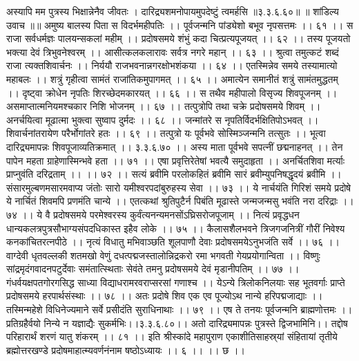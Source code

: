 अस्यापि मम पुत्रस्य भिक्षान्नेनैव जीवतः ।
दारिद्र्यशमनोपायमुपदेष्टुं त्वमर्हसि ॥३.३.६.६०॥
॥ शांडिल्य उवाच ॥॥
अमुष्य बालस्य पिता स विदर्भमहीपतिः ।।
पूर्वजन्मनि पांड्येशो बभूव नृपसत्तमः ।। ६१ ।।
स राजा सर्वधर्मज्ञः पालयन्सकलां महीम् ।।
प्रदोषसमये शंभुं कदा चित्प्रत्यपूजयत् ।। ६२ ।।
तस्य पूजयतो भक्त्या देवं त्रिभुवनेश्वरम् ।।
आसीत्कलकलारावः सर्वत्र नगरे महान् ।। ६३ ।।
श्रुत्वा तमुत्कटं शब्दं राजा त्यक्तशिवार्चनः ।।
निर्ययौ राजभवनान्नगरक्षोभशंकया ।। ६४ ।।
एतस्मिन्नेव समये तस्यामात्यो महाबलः ।।
शत्रुं गृहीत्वा सामंतं राजांतिकमुपागमत् ।। ६५ ।।
अमात्येन समानीतं शत्रुं सामंतमुद्धतम् ।।
दृष्ट्वा क्रोधेन नृपतिः शिरच्छेदमकारयत् ।। ६६ ।।
स तथैव महीपालो विसृज्य शिवपूजनम् ।।
असमाप्तात्मनियमश्चकार निशि भोजनम् ।। ६७ ।।
तत्पुत्रोपि तथा चक्रे प्रदोषसमये शिवम् ।।
अनर्चयित्वा मूढात्मा भुक्त्वा सुष्वाप दुर्मदः ।। ६८ ।।
जन्मांतरे स नृपतिर्विदर्भक्षितिपोऽभवत् ।।
शिवार्चनांतरायेण परैर्भोगांतरे हतः ।। ६९ ।।
तत्पुत्रो यः पूर्वभवे सोस्मिञ्जन्मनि तत्सुतः ।।
भूत्वा दारिद्र्यमापन्नः शिवपूजाव्यतिक्रमात् ।। ३.३.६.७० ।।
अस्य माता पूर्वभवे सपत्नीं छद्मनाहनत् ।।
तेन पापेन महता ग्राहेणास्मिन्भवे हता ।। ७१ ।।
एषा प्रवृत्तिरेतेषां भवत्यै समुदाहृता ।।
अनर्चितशिवा मर्त्याः प्राप्नुवंति दरिद्रताम् ।। ।। ७२ ।।
सत्यं ब्रवीमि परलोकहितं ब्रवीमि सारं ब्रवीम्युपनिषद्धृदयं ब्रवीमि ।।
संसारमुल्बणमसारमवाप्य जंतोः सारो यमीश्वरपदांबुरुहस्य सेवा ।। ७३ ।।
ये नार्चयंति गिरिशं समये प्रदोषे ये नार्चितं शिवमपि प्रणमंति चान्ये ।।
एतत्कथां श्रुतिपुटैर्न पिबंति मूढास्ते जन्मजन्मसु भवंति नरा दरिद्राः ।। ७४ ।।
ये वै प्रदोषसमये परमेश्वरस्य कुर्वंत्यनन्यमनसोंऽघ्रिसरोजपूजाम् ।।
नित्यं प्रवृद्धधन धान्यकलत्रपुत्रसौभाग्यसंपदधिकास्त इहैव लोके ।। ७५ ।।
कैलासशैलभवने त्रिजगजनित्रीं गौरीं निवेश्य कनकांचितरत्नपीठे ।।
नृत्यं विधातु मभिवाञ्छति शूलपाणौ देवाः प्रदोषसमयेऽनुभजंति सर्वे ।। ७६ ।।
वाग्देवी धृतवल्लकी शतमखो वेणुं दधत्पद्मजस्तालोन्निद्रकरो रमा भगवती गेयप्रयोगान्विता ।।
विष्णुः सांद्रमृदंगवादनपटुर्देवाः समंतात्स्थिताः सेवंते तमनु प्रदोषसमये देवं मृडानीपतिम् ।। ७७ ।।
गंधर्वयक्षपतगोरगसिद्ध साध्या विद्याधरामरवराप्सरसां गणाश्च ।।
येऽन्ये त्रिलोकनिलयाः सह भूतवर्गाः प्राप्ते प्रदोषसमये हरपार्थसंस्थाः ।। ७८ ।।
अतः प्रदोषे शिव एक एव पूज्योऽथ नान्ये हरिपद्मजाद्याः ।।
तस्मिन्महेशे विधिनेज्यमाने सर्वे प्रसीदंति सुराधिनाथाः ।। ७९ ।।
एष ते तनयः पूर्वजन्मनि ब्राह्मणोत्तमः ।।
प्रतिग्रहैर्वयो निन्ये न यज्ञाद्यैः सुकर्मभिः।।३.३.६.८०।।
अतो दारिद्र्यमापन्नः पुत्रस्ते द्विजभामिनि।।
तद्दोष परिहारार्थं शरणं यातु शंकरम् ।। ८१ ।।
इति श्रीस्कांदे महापुराण एकाशीतिसाहस्र्यां संहितायां तृतीये ब्रह्मोत्तरखण्डे प्रदोषमाहात्म्यवर्णनंनाम षष्ठोऽध्यायः ।। ६ ।। ।। छ ।।

